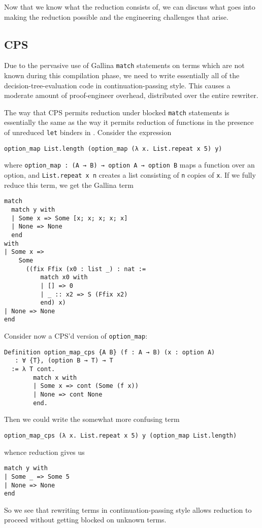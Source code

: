 Now that we know what the reduction consists of, we can discuss what goes into making the reduction possible and the engineering challenges that arise.

\subsection{CPS}\label{sec:rewriting-more:prereduction:cps}
Due to the pervasive use of Gallina \texttt{match} statements on terms which are not known during this compilation phase, we need to write essentially all of the decision-tree-evaluation code in continuation-passing style.
This causes a moderate amount of proof-engineer overhead, distributed over the entire rewriter.

The way that CPS permits reduction under blocked \texttt{match} statements is essentially the same as the way it permits reduction of functions in the presence of unreduced \texttt{let} binders in .
Consider the expression
\begin{center}
\begin{verbatim}
option_map List.length (option_map (λ x. List.repeat x 5) y)
\end{verbatim}
\end{center}
\noindent
where \texttt{option_map : (A → B) → option A → option B} maps a function over an option, and \texttt{List.repeat x n} creates a list consisting of \texttt{n} copies of \texttt{x}.
If we fully reduce this term, we get the Gallina term
\begin{verbatim}
match
  match y with
  | Some x => Some [x; x; x; x; x]
  | None => None
  end
with
| Some x =>
    Some
      ((fix Ffix (x0 : list _) : nat :=
          match x0 with
          | [] => 0
          | _ :: x2 => S (Ffix x2)
          end) x)
| None => None
end
\end{verbatim}

Consider now a CPS'd version of \texttt{option_map}:
\begin{verbatim}
Definition option_map_cps {A B} (f : A → B) (x : option A)
   : ∀ {T}, (option B → T) → T
  := λ T cont.
        match x with
        | Some x => cont (Some (f x))
        | None => cont None
        end.
\end{verbatim}
\noindent
Then we could write the somewhat more confusing term
\begin{verbatim}
option_map_cps (λ x. List.repeat x 5) y (option_map List.length)
\end{verbatim}
\noindent
whence reduction gives us
\begin{verbatim}
match y with
| Some _ => Some 5
| None => None
end
\end{verbatim}
\noindent
So we see that rewriting terms in continuation-passing style allows reduction to proceed without getting blocked on unknown terms.

